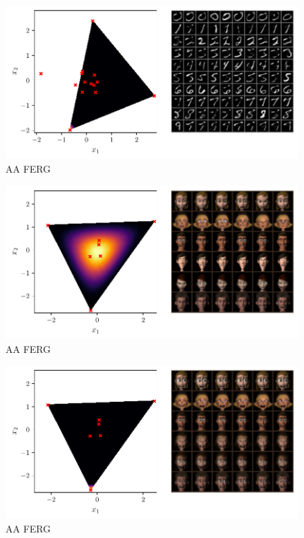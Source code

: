 \begin{figure}[htpb]
    \centering
    \includegraphics[width=1\linewidth]{figures/samples/aa_emnist3.pdf}
    \caption{AA FERG}%
    \label{fig:aa_emnist}
\end{figure}

\begin{figure}[htpb]
    \centering
    \includegraphics[width=1\linewidth]{figures/samples/aa_ferg.pdf}
    \caption{AA FERG}%
    \label{fig:aa_ferg}
\end{figure}

\begin{figure}[htpb]
    \centering
    \includegraphics[width=1\linewidth]{figures/samples/aa_ferg1.pdf}
    \caption{AA FERG}%
    \label{fig:aa_ferg}
\end{figure}

